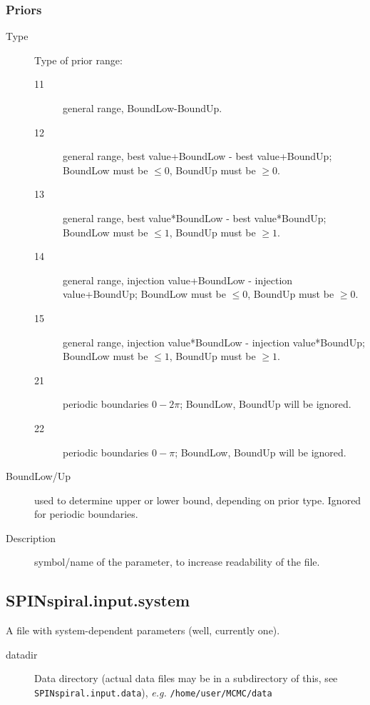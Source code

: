 \documentclass[10pt]{article}
\begin{document}
\subsubsection{Priors}
\begin{description}                
\item[Type] Type of prior range:
  \begin{description}                
  \item[11] general range, BoundLow-BoundUp.
  \item[12] general range, best value+BoundLow - best value+BoundUp; BoundLow must be $\leq 0$, BoundUp must be $\geq 0$.
  \item[13] general range, best value*BoundLow - best value*BoundUp; BoundLow must be $\leq 1$, BoundUp must be $\geq 1$. 
  \item[14] general range, injection value+BoundLow - injection value+BoundUp; BoundLow must be $\leq 0$, BoundUp must be $\geq 0$.
  \item[15] general range, injection value*BoundLow - injection value*BoundUp; BoundLow must be $\leq 1$, BoundUp must be $\geq 1$. 
  \item[21] periodic boundaries $0-2\pi$; BoundLow, BoundUp will be ignored.
  \item[22] periodic boundaries $0-\pi$; BoundLow, BoundUp will be ignored.
  \end{description}                
\item[BoundLow/Up] used to determine upper or lower bound, depending on prior type.  Ignored for periodic boundaries.
\item[Description] symbol/name of the parameter, to increase readability of the file.
\end{description}                



\pagebreak
\subsection{SPINspiral.input.system}
A file with system-dependent parameters (well, currently one).

\begin{description}
\item[datadir] Data directory (actual data files may be in a subdirectory of this, see \texttt{SPINspiral.input.data}), \textit{e.g.} \texttt{/home/user/MCMC/data}
\end{description}
\end{document}
